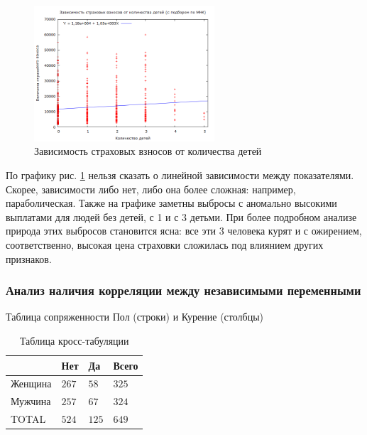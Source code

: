 \documentclass[a4paper,12pt]{article}
\begin{document}
\begin{figure}[H]
	\includegraphics[width=0.6\textwidth]{../[graphics]/charges-children.png}
	\centering
	\caption{Зависимость страховых взносов от количества детей}
	\label{fig:charges-children}
\end{figure}

По графику рис. \ref{fig:charges-children} нельзя сказать о линейной зависимости между показателями. Скорее, зависимости либо нет, либо она более сложная: например, параболическая. Также на графике заметны выбросы с аномально высокими выплатами для людей без детей, с 1 и с 3 детьми. При более подробном анализе природа этих выбросов становится ясна: все эти 3 человека курят и с ожирением, соответственно, высокая цена страховки сложилась под влиянием других признаков.

\subsubsection{Анализ наличия корреляции между независимыми переменными}

\begin{table}[H]
	\begin{center}
		Таблица сопряженности Пол (строки) и Курение (столбцы)\\
		
		\vspace{8pt}
		
		\begin{tabular}{|l|l|l|l|}
			\hline
		    & Нет & Да & Всего \\[1ex]
		    \hline
			Женщина & $267$ & $58$ & $325$\\
			\hline
			Мужчина & $257$ & $67$ & $324$\\[1ex]
			\hline
			TOTAL & $524$ & $125$ & $649$\\
			\hline
		\end{tabular}
		\caption{Таблица кросс-табуляции}
		\label{tab:cross}
	\end{center}
\end{table}
\end{document}
